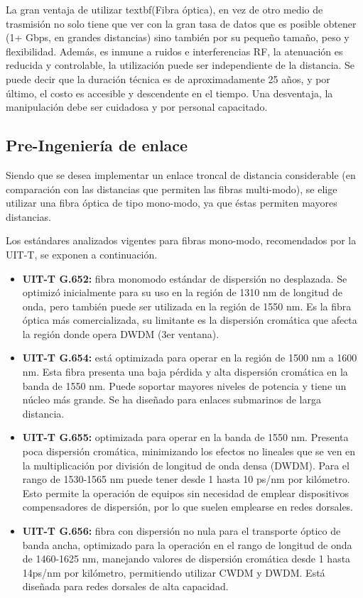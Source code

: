 \documentclass[12pt,a4paper]{book}
\begin{document}
La gran ventaja de utilizar textbf(Fibra óptica), en vez de otro medio de trasmisión no solo tiene que ver con la gran tasa de datos que es posible obtener (1+ Gbps, en grandes distancias) sino también por su pequeño tamaño, peso y flexibilidad. Además, es inmune a ruidos e interferencias RF, la atenuación es reducida y controlable, la utilización puede ser independiente de la distancia. Se puede decir que la duración técnica es de aproximadamente 25 años, y por último, el costo es accesible y descendente en el tiempo. Una desventaja, la manipulación debe ser cuidadosa y por personal capacitado.

\subsection{Pre-Ingeniería de enlace}\label{subsec_pre_ing_enlace_fo_trans}

Siendo que se desea implementar un enlace troncal de distancia considerable (en comparación con las distancias que permiten las fibras multi-modo), se elige utilizar una fibra óptica de tipo mono-modo, ya que éstas permiten mayores distancias.

Los estándares analizados vigentes para fibras mono-modo, recomendados por la UIT-T, se exponen a continuación.

\begin{itemize}
\item \textbf{UIT-T G.652:} fibra monomodo estándar de dispersión no desplazada. Se optimizó inicialmente para su uso en la región de 1310 nm de longitud de onda, pero también puede ser utilizada en la región de 1550 nm. Es la fibra óptica más comercializada, su limitante es la dispersión cromática que afecta la región donde opera DWDM (3er ventana).

\item \textbf{UIT-T G.654:} está optimizada para operar en la región de 1500 nm a 1600 nm. Esta fibra presenta una baja pérdida y alta dispersión cromática en la banda de 1550 nm. Puede soportar mayores niveles de potencia y tiene un núcleo más grande. Se ha diseñado para enlaces submarinos de larga distancia.

\item \textbf{UIT-T G.655:} optimizada para operar en la banda de 1550 nm. Presenta poca dispersión cromática, minimizando los efectos no lineales que se ven en la multiplicación por división de longitud de onda densa (DWDM). Para el rango de 1530-1565 nm puede tener desde 1 hasta 10 ps/nm por kilómetro. Esto permite la operación de equipos sin necesidad de emplear dispositivos compensadores de dispersión, por lo que suelen emplearse en redes dorsales.

\item \textbf{UIT-T G.656:} fibra con dispersión no nula para el transporte óptico de banda ancha, optimizado para la operación en el rango de longitud de onda de 1460-1625 nm, manejando valores de dispersión cromática desde 1 hasta 14ps/nm por kilómetro, permitiendo utilizar CWDM y DWDM. Está diseñada para redes dorsales de alta capacidad.
\end{itemize}
\end{document}
